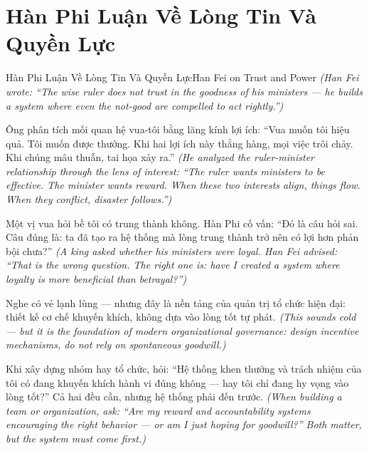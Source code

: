 \section{Hàn Phi Luận Về Lòng Tin Và Quyền Lực}
\begin{truyen}{Hàn Phi Luận Về Lòng Tin Và Quyền Lực}{Han Fei on Trust and Power}
\textit{(Han Fei wrote: ``The wise ruler does not trust in the goodness of his ministers — he builds a system where even the not-good are compelled to act rightly.'')}

Ông phân tích mối quan hệ vua-tôi bằng lăng kính lợi ích: ``Vua muốn tôi hiệu quả. Tôi muốn được thưởng. Khi hai lợi ích này thẳng hàng, mọi việc trôi chảy. Khi chúng mâu thuẫn, tai họa xảy ra.''
\textit{(He analyzed the ruler-minister relationship through the lens of interest: ``The ruler wants ministers to be effective. The minister wants reward. When these two interests align, things flow. When they conflict, disaster follows.'')}

Một vị vua hỏi bề tôi có trung thành không. Hàn Phi cố vấn: ``Đó là câu hỏi sai. Câu đúng là: ta đã tạo ra hệ thống mà lòng trung thành trở nên có lợi hơn phản bội chưa?''
\textit{(A king asked whether his ministers were loyal. Han Fei advised: ``That is the wrong question. The right one is: have I created a system where loyalty is more beneficial than betrayal?'')}

Nghe có vẻ lạnh lùng — nhưng đây là nền tảng của quản trị tổ chức hiện đại: thiết kế cơ chế khuyến khích, không dựa vào lòng tốt tự phát.
\textit{(This sounds cold — but it is the foundation of modern organizational governance: design incentive mechanisms, do not rely on spontaneous goodwill.)}

\end{truyen}

\begin{baihoc}
Khi xây dựng nhóm hay tổ chức, hỏi: ``Hệ thống khen thưởng và trách nhiệm của tôi có đang khuyến khích hành vi đúng không — hay tôi chỉ đang hy vọng vào lòng tốt?'' Cả hai đều cần, nhưng hệ thống phải đến trước.
\textit{(When building a team or organization, ask: ``Are my reward and accountability systems encouraging the right behavior — or am I just hoping for goodwill?'' Both matter, but the system must come first.)}
\end{baihoc}
\ngancach


